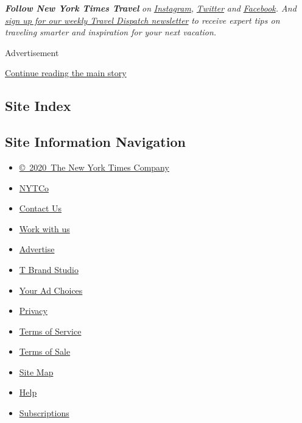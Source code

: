 \emph{\textbf{Follow New York Times Travel}} \emph{on}
\href{https://www.instagram.com/nytimestravel/}{\emph{Instagram}}\emph{,}
\href{https://twitter.com/nytimestravel}{\emph{Twitter}} \emph{and}
\href{https://www.facebook.com/nytimestravel/}{\emph{Facebook}}\emph{.
And}
\href{https://www.nytimes.com/newsletters/traveldispatch}{\emph{sign up
for our weekly Travel Dispatch newsletter}} \emph{to receive expert tips
on traveling smarter and inspiration for your next vacation.}

Advertisement

\protect\hyperlink{after-bottom}{Continue reading the main story}

\hypertarget{site-index}{%
\subsection{Site Index}\label{site-index}}

\hypertarget{site-information-navigation}{%
\subsection{Site Information
Navigation}\label{site-information-navigation}}

\begin{itemize}
\tightlist
\item
  \href{https://help.nytimes.com/hc/en-us/articles/115014792127-Copyright-notice}{©~2020~The
  New York Times Company}
\end{itemize}

\begin{itemize}
\tightlist
\item
  \href{https://www.nytco.com/}{NYTCo}
\item
  \href{https://help.nytimes.com/hc/en-us/articles/115015385887-Contact-Us}{Contact
  Us}
\item
  \href{https://www.nytco.com/careers/}{Work with us}
\item
  \href{https://nytmediakit.com/}{Advertise}
\item
  \href{http://www.tbrandstudio.com/}{T Brand Studio}
\item
  \href{https://www.nytimes.com/privacy/cookie-policy\#how-do-i-manage-trackers}{Your
  Ad Choices}
\item
  \href{https://www.nytimes.com/privacy}{Privacy}
\item
  \href{https://help.nytimes.com/hc/en-us/articles/115014893428-Terms-of-service}{Terms
  of Service}
\item
  \href{https://help.nytimes.com/hc/en-us/articles/115014893968-Terms-of-sale}{Terms
  of Sale}
\item
  \href{https://spiderbites.nytimes.com}{Site Map}
\item
  \href{https://help.nytimes.com/hc/en-us}{Help}
\item
  \href{https://www.nytimes.com/subscription?campaignId=37WXW}{Subscriptions}
\end{itemize}
